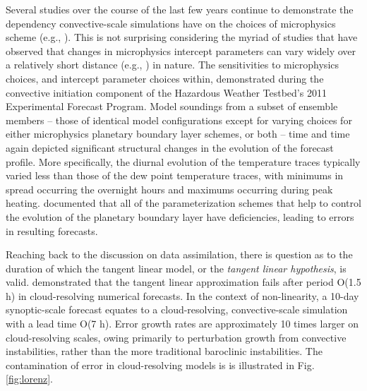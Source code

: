 Several studies over the course of the last few years continue to demonstrate the dependency convective-scale simulations have on the choices of microphysics scheme (e.g., \citealp{tong2008simultaneous, hong2009sensitivities, yussouf2012radarcomparisons, bryan2012microphysics}). This is not surprising considering the myriad of studies that have observed that changes in microphysics intercept parameters can vary widely over a relatively short distance (e.g., \citealp{joss1969dsderrors, ziegler1983hail}) in nature. The sensitivities to microphysics choices, and intercept parameter choices within, demonstrated during the convective initiation component of the Hazardous Weather Testbed's 2011 Experimental Forecast Program. Model soundings from a subset of ensemble members -- those of identical model configurations except for varying choices for either microphysics planetary boundary layer schemes, or both -- time and time again depicted significant structural changes in the evolution of the forecast profile. More specifically, the diurnal evolution of the temperature traces typically varied less than those of the dew point temperature traces, with minimums in spread occurring the overnight hours and maximums occurring during peak heating. \cite{marshall2003pbl} documented that all of the parameterization schemes that help to control the evolution of the planetary boundary layer have deficiencies, leading to errors in resulting forecasts.


Reaching back to the discussion on data assimilation, there is question as to the duration of which the tangent linear model, or the \emph{tangent linear hypothesis}, is valid. \cite{hohenegger2007predictability} demonstrated that the tangent linear approximation fails after period O(1.5 h) in cloud-resolving numerical forecasts. In the context of non-linearity, a 10-day synoptic-scale forecast equates to a cloud-resolving, convective-scale simulation with a lead time O(7 h). Error growth rates are approximately 10 times larger on cloud-resolving scales, owing primarily to perturbation growth from convective instabilities, rather than the more traditional baroclinic instabilities. The contamination of error in cloud-resolving models is is illustrated in Fig. \ref{fig:lorenz}.



